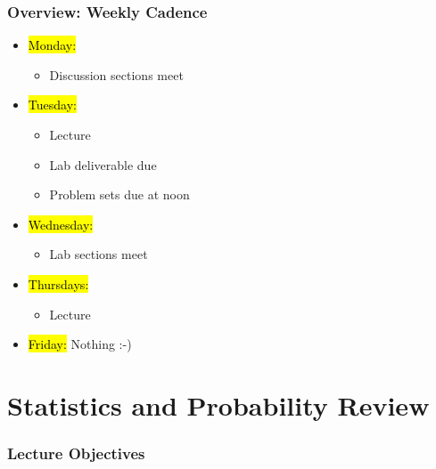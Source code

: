 \documentclass[slidestop,compress,mathserif]{beamer}
\begin{document}
\begin{frame}
	\frametitle{Overview: Weekly Cadence} 
	\begin{itemize}
		\item \hl{Monday:} 
			\begin{itemize}
				\item Discussion sections meet
			\end{itemize}
		\item \hl{Tuesday:} 
			\begin{itemize}
				\item Lecture
				\item Lab deliverable due
				\item Problem sets due at noon 
			\end{itemize}
		\item \hl{Wednesday:} 
			\begin{itemize}
				\item Lab sections meet
			\end{itemize}
		\item \hl{Thursdays:} 
			\begin{itemize}
				\item Lecture
			\end{itemize}
		\item \hl{Friday:} Nothing :-)
	\end{itemize}
\end{frame}

\section{Statistics and Probability Review}

\begin{frame}
    \frametitle{Lecture Objectives}
\end{frame}
\end{document}
